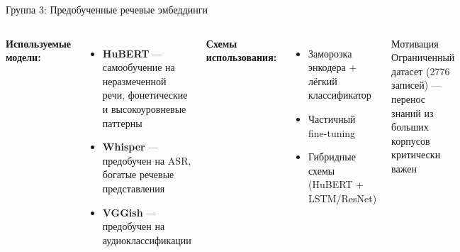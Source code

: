 \documentclass[aspectratio=169]{beamer}
\begin{document}
\begin{frame}{Группа 3: Предобученные речевые эмбеддинги}
  \begin{columns}[T]
      \textbf{Используемые модели:}
      \begin{itemize}
        \item \textbf{HuBERT} — самообучение на неразмеченной речи, фонетические и высокоуровневые паттерны
        \item \textbf{Whisper} — предобучен на ASR, богатые речевые представления
        \item \textbf{VGGish} — предобучен на аудиоклассификации
      \end{itemize}
      \textbf{Схемы использования:}
      \begin{itemize}
        \item Заморозка энкодера + лёгкий классификатор
        \item Частичный fine-tuning
        \item Гибридные схемы (HuBERT + LSTM/ResNet)
      \end{itemize}
      \begin{block}{Мотивация}
        \small Ограниченный датасет (2776 записей) — перенос знаний из больших корпусов критически важен
      \end{block}
  \end{columns}
\end{frame}
\end{document}
